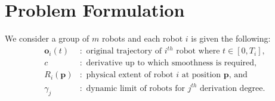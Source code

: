 \documentclass{svproc}
\newcommand{\vp}{\mathbf{p}}
\newcommand{\vo}{\mathbf{o}}
\newcommand{\cO}{\mathcal{O}}
\newcommand{\todo}[1]{\textbf{\textcolor{red}{TODO: #1}}}
\begin{document}

\section{Problem Formulation} \label{problemFormulation}

We consider a group of $m$ robots and each robot $i$ is given the following:
\begin{align*}
    \vo_i(t)&:\text{ original trajectory of $i^{th}$ robot where } t\in[0,T_i],\\
    c&:\text{ derivative up to which smoothness is required},\\
    R_i(\vp)&:\text{ physical extent of robot $i$ at position $\vp$, and}\\
    \gamma_j&: \text{ dynamic limit of robots for $j^{th}$ derivation degree}.%
\end{align*}
\end{document}
